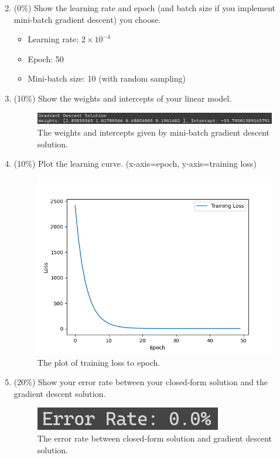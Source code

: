 \documentclass[twocolumn]{extarticle}
\begin{document}
\begin{enumerate}
\setcounter{enumi}{1}
\item (0\%)   Show the learning rate and epoch (and batch size if you implement mini-batch gradient descent) you choose.
\begin{itemize}
	\item Learning rate: $2 \times 10^{-4}$
	\item Epoch: 50
	\item Mini-batch size: 10 (with random sampling)
\end{itemize}
\item (10\%) Show the weights and intercepts of your linear model.
\begin{figure}[H]
\centering
\includegraphics[width=\linewidth]{gradient_weights}
\caption{The weights and intercepts given by mini-batch gradient descent solution.}
\label{fig:gradientweights}
\end{figure}


\item (10\%) Plot the learning curve. (x-axis=epoch, y-axis=training loss)
\begin{figure}[H]
\centering
\includegraphics[width=\linewidth]{lr_plot}
\caption{The plot of training loss to epoch.}
\label{fig:lrplot}
\end{figure}

\item (20\%) Show your error rate between your closed-form solution and the gradient descent solution.
\begin{figure}[H]
\centering
\includegraphics[width=0.5\linewidth]{error_rate}
\caption{The error rate between closed-form solution and gradient descent solution.}
\label{fig:errorrate}
\end{figure}
\end{enumerate}
\end{document}
